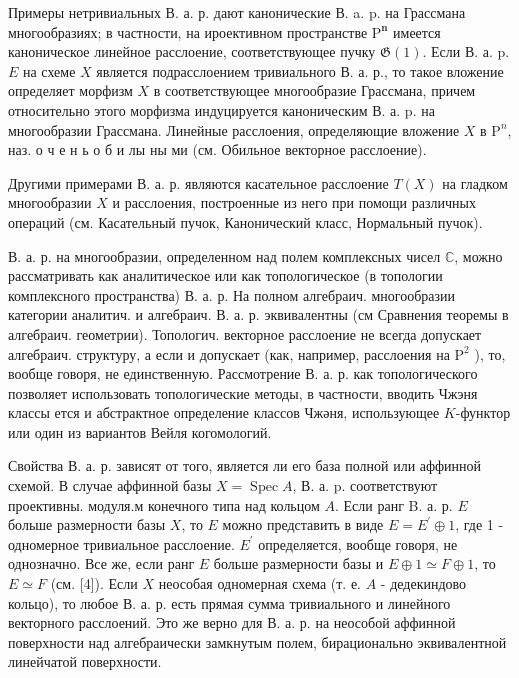 \documentclass[10pt]{article}
\begin{document}
Примеры нетривиальных В. а. р. дают канонические В. a. p. на Грассмана многообразиях; в частности, на ироективном пространстве $\mathrm{P}^{\boldsymbol{n}}$ имеется каноническое линейное расслоение, соответствующее пучку $\mathfrak{G}(1)$. Если В. а. p. $E$ на схеме $X$ является подрасслоением тривиального В. а. р., то такое вложение определяет морфизм $X$ в соответствующее многообразие Грассмана, причем относительно этого морфизма индуцируется каноническим В. а. p. на многообразии Грассмана. Линейные расслоения, определяющие вложение $X$ в $\mathrm{P}^{n}$, наз. о ч е н ь о б и лы ны ми (см. Обильное векторное расслоение).



Другими примерами В. а. р. являются касательное расслоение $T(X)$ на гладком многообразии $X$ и расслоения, построенные из него при помощи различных операций (см. Касательный пучок, Канонический класс, Нормальный пучок).



В. а. р. на многообразии, определенном над полем комплексных чисел $\mathbb{C}$, можно рассматривать как аналитическое или как топологическое (в топологии комплексного пространства) В. а. р. На полном алгебраич. многообразии категории аналитич. и алгебраич. В. а. р. эквивалентны (см Сравнения теоремы в алгебраич. геометрии). Топологич. векторное расслоение не всегда допускает алгебраич. структуру, а если и допускает (как, например, расслоения на $\mathrm{P}^{2}$ ), то, вообще говоря, не единственную. Рассмотрение В. а. р. как топологического позволяет использовать топологические методы, в частности, вводить Чжэня классы ется и абстрактное определение классов Чжәня, использующее $K$-функтор или один из вариантов Вейля когомологий.



Свойства В. а. р. зависят от того, является ли его база полной или аффинной схемой. В случае аффинной базы $X=\operatorname{Spec} A$, В. а. p. соответствуют проективны. модуля.м конечного типа над кольцом $A$. Если ранг B. а. р. $E$ больше размерности базы $X$, то $E$ можно представить в виде $E=E^{\prime} \oplus 1$, где 1 - одномерное тривиальное расслоение. $E^{\prime}$ определяется, вообще говоря, не однозначно. Все же, если ранг $E$ больше размерности базы и $E \oplus 1 \simeq F \oplus 1$, то $E \simeq F$ (см. [4]). Если $X$ неособая одномерная схема (т. е. $A$ - дедекиндово кольцо), то любое В. а. р. есть прямая сумма тривиального и линейного векторного расслоений. Это же верно для В. а. р. на неособой аффинной поверхности над алгебраически замкнутым полем, бирационально эквивалентной линейчатой поверхности.
\end{document}
